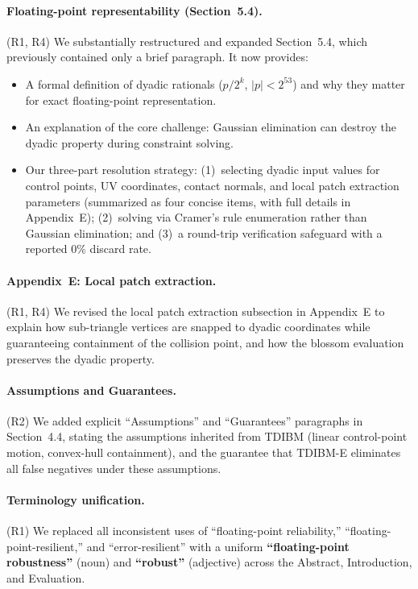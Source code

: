 \documentclass{article}
\begin{document}
\paragraph{Floating-point representability (Section~5.4).}
(R1, R4) We substantially restructured and expanded Section~5.4, which previously contained only a brief paragraph. It now provides:
\begin{itemize}[nosep]
    \item A formal definition of dyadic rationals ($p/2^k$, $|p|<2^{53}$) and why they matter for exact floating-point representation.
    \item An explanation of the core challenge: Gaussian elimination can destroy the dyadic property during constraint solving.
    \item Our three-part resolution strategy: (1)~selecting dyadic input values for control points, UV coordinates, contact normals, and local patch extraction parameters (summarized as four concise items, with full details in Appendix~E); (2)~solving via Cramer's rule enumeration rather than Gaussian elimination; and (3)~a round-trip verification safeguard with a reported 0\% discard rate.
\end{itemize}

\paragraph{Appendix~E: Local patch extraction.}
(R1, R4) We revised the local patch extraction subsection in Appendix~E to explain how sub-triangle vertices are snapped to dyadic coordinates while guaranteeing containment of the collision point, and how the blossom evaluation preserves the dyadic property.

\paragraph{Assumptions and Guarantees.}
(R2) We added explicit ``Assumptions'' and ``Guarantees'' paragraphs in Section~4.4, stating the assumptions inherited from TDIBM (linear control-point motion, convex-hull containment), and the guarantee that TDIBM-E eliminates all false negatives under these assumptions.

\paragraph{Terminology unification.}
(R1) We replaced all inconsistent uses of ``floating-point reliability,'' ``floating-point-resilient,'' and ``error-resilient'' with a uniform \textbf{``floating-point robustness''} (noun) and \textbf{``robust''} (adjective) across the Abstract, Introduction, and Evaluation.
\end{document}
